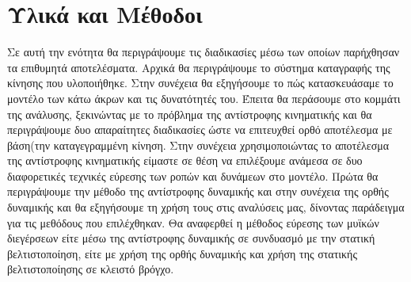 \chapter{Υλικά και Μέθοδοι}

Σε αυτή την ενότητα θα περιγράψουμε τις διαδικασίες μέσω των οποίων παρήχθησαν τα επιθυμητά αποτελέσματα. Αρχικά θα περιγράψουμε το σύστημα καταγραφής της κίνησης που υλοποιήθηκε. Στην συνέχεια θα εξηγήσουμε το πώς κατασκευάσαμε το μοντέλο των κάτω άκρων και τις δυνατότητές του. Έπειτα θα περάσουμε στο κομμάτι της ανάλυσης, ξεκινώντας με το πρόβλημα της αντίστροφης κινηματικής και θα περιγράψουμε δυο απαραίτητες διαδικασίες ώστε να επιτευχθεί ορθό αποτέλεσμα με βάση(την καταγεγραμμένη κίνηση. Στην συνέχεια χρησιμοποιώντας το αποτέλεσμα της αντίστροφης κινηματικής είμαστε σε θέση να επιλέξουμε ανάμεσα σε δυο διαφορετικές τεχνικές εύρεσης των ροπών και δυνάμεων στο μοντέλο. Πρώτα θα περιγράψουμε την μέθοδο της αντίστροφης δυναμικής και στην συνέχεια της ορθής δυναμικής και θα εξηγήσουμε τη χρήση τους στις αναλύσεις μας, δίνοντας παράδειγμα για τις μεθόδους που επιλέχθηκαν. Θα αναφερθεί η μέθοδος εύρεσης των μυϊκών διεγέρσεων είτε μέσω της αντίστροφης δυναμικής σε συνδυασμό με την στατική βελτιστοποίηση, είτε με χρήση της ορθής δυναμικής και χρήση της στατικής βελτιστοποίησης σε κλειστό βρόγχο.

%


